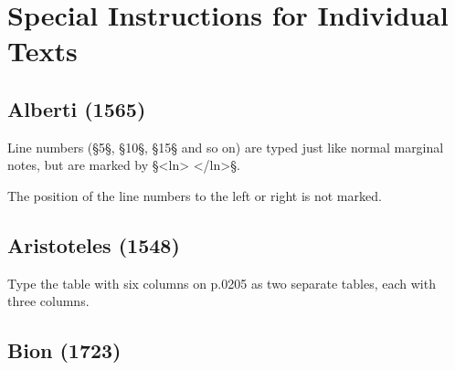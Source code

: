 \documentclass[fontsize=11pt, paper=a4, 
DIV15,
normalheadings,
parskip=half-, 
pointlessnumbers]{scrartcl}
\begin{document}








\section{Special Instructions for Individual Texts}

\subsection{Alberti (1565)}

\begin{mainrule}
Line numbers (§5§, §10§, §15§ and so on) are typed just like normal marginal notes, but are marked by §<ln> </ln>§.
\end{mainrule}

\begin{clarification}
The position of the line numbers to the left or right is not marked.
\end{clarification}

\subsection{Aristoteles (1548)}

\begin{mainrule}
Type the table with six columns on p.0205 as two separate tables, each with three columns.
\end{mainrule}

\subsection{Bion (1723)}
\end{document}
